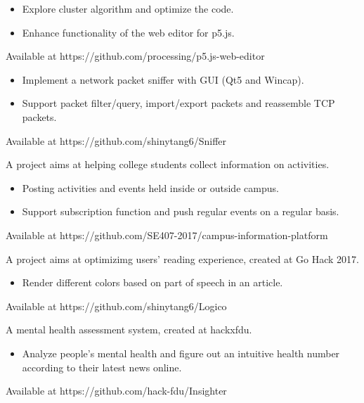 \documentclass{resume}
\begin{document}
\begin{itemize}
  \item Explore cluster algorithm and optimize the code.
\end{itemize}

\begin{itemize}
  \item Enhance functionality of the web editor for p5.js.
\end{itemize}
Available at https://github.com/processing/p5.js-web-editor


\begin{itemize}
  \item Implement a network packet sniffer with GUI (Qt5 and Wincap).
  \item Support packet filter/query, import/export packets and reassemble TCP packets.
\end{itemize}
Available at https://github.com/shinytang6/Sniffer


A project aims at helping college students collect information on activities.\begin{itemize}
  \item Posting activities and events held inside or outside campus.
  \item Support subscription function and push regular events on a regular basis.
\end{itemize}
Available at https://github.com/SE407-2017/campus-information-platform


A project aims at optimizimg users' reading experience, created at Go Hack 2017.
\begin{itemize}
  \item Render different colors based on part of speech in an article.
\end{itemize}
Available at https://github.com/shinytang6/Logico

A mental health assessment system, created at hackxfdu.
\begin{itemize}
  \item Analyze people's mental health and figure out an intuitive health number according to their latest news online.
\end{itemize}
Available at https://github.com/hack-fdu/Insighter
\end{document}
